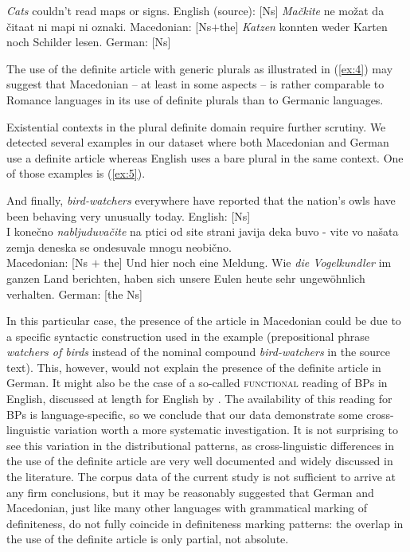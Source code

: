\documentclass[output=paper,colorlinks,citecolor=brown]{langscibook}
\begin{document}
\ea \label{ex:4} \ea \label{ex:4a} \textit{Cats} couldn't read maps or signs. \hfill English (source): [Ns] 
\ex \label{ex:4b} \textit {Mačkite} ne možat da čitaat ni mapi ni oznaki. \hfill Macedonian: [Ns$+$the] 
\ex \label{ex:4c} \textit{Katzen} konnten weder Karten noch Schilder lesen. \hfill German: [Ns] \z\z

\noindent The use of the definite article with generic plurals as illustrated in (\ref{ex:4}) may suggest that Macedonian -- at least in some aspects -- is rather comparable to Romance languages in its use of definite plurals than to Germanic languages. 

Existential contexts in the plural definite domain require further scrutiny. We detected several examples in our dataset where both Macedonian and German use a definite article whereas English uses a bare plural in the same context. One of those examples is (\ref{ex:5}). 

\ea \label{ex:5} \ea \label{ex:5a} And finally, \textit{bird-watchers} everywhere have reported that the nation's owls have been behaving very unusually today. \hfill English: [Ns]\\
\ex \label{ex:5b}
I kone\v{c}no \textit{nabljuduva\v{c}ite} na ptici od site strani javija deka buvo - vite vo na\v{s}ata zemja deneska se ondesuvale mnogu neobi\v{c}no. \\
\hfill Macedonian: [Ns $+$ the]
\ex \label{ex:5c}
Und hier noch eine Meldung. Wie \textit{die Vogelkundler} im ganzen Land berichten, haben sich unsere Eulen heute sehr ungewöhnlich verhalten.
\hfill German: [the Ns] \\

\z\z

\noindent In this particular case, the presence of the article in Macedonian could be due to a specific syntactic construction used in the example (prepositional phrase \textit{watchers of birds} instead of the nominal compound \textit{bird-watchers} in the source text). This, however, would not explain the presence of the definite article in German. It might also be the case of a so-called \textsc{functional} reading of BPs in English, discussed at length for English by \citet{Condoravdi1994}. The availability of this reading for BPs is language-specific, so we conclude that our data demonstrate some cross-linguistic variation worth a more systematic investigation. It is not surprising to see this variation in the distributional patterns, as cross-linguistic differences in the use of the definite article are very well documented and widely discussed in the literature. The corpus data of the current study is not sufficient to arrive at any firm conclusions, but it may be reasonably suggested that German and Macedonian, just like many other languages with grammatical marking of definiteness, do not fully coincide in definiteness marking patterns: the overlap in the use of the definite article is only partial, not absolute. 
\end{document}
